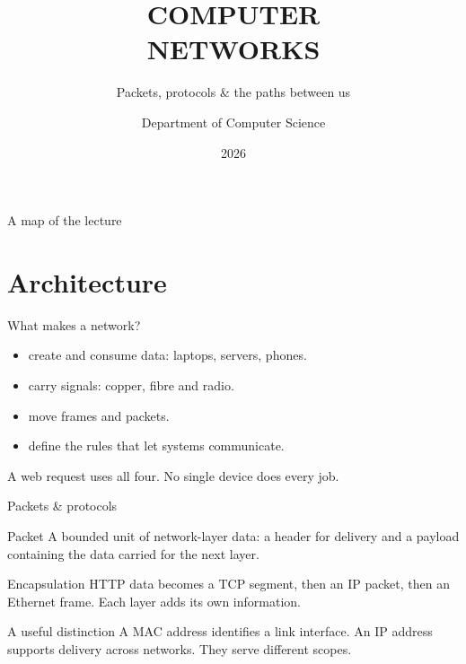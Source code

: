 \documentclass[aspectratio=\DemoAspect,10pt]{beamer}
\title[COMPUTER NETWORKS]{COMPUTER\\NETWORKS}
\subtitle{Packets, protocols \& the paths between us}
\author{Department of Computer Science}
\institute{Y2K / FIELD NOTES 01}
\date{2026}
\begin{document}
\begin{frame}[plain]\titlepage\end{frame}
\begin{frame}{A map of the lecture}
\end{frame}
\section{Architecture}
\begin{frame}{What makes a network?}
  \begin{itemize}\setlength{\itemsep}{.45cm}
    \item {} create and consume data: laptops, servers, phones.
    \item {} carry signals: copper, fibre and radio.
    \item {} move frames and packets.
    \item {} define the rules that let systems communicate.
  \end{itemize}
  \vspace{.25cm}
  \YTwoKSeparator
  {\small\color{y2kMuted}A web request uses all four. No single device does every job.}
\end{frame}
\begin{frame}{Packets \& protocols}
  \begin{YTwoKDefinition}{Packet}
    A bounded unit of network-layer data: a header for delivery and a payload
    containing the data carried for the next layer.
  \end{YTwoKDefinition}
  \begin{YTwoKExample}{Encapsulation}
    HTTP data becomes a TCP segment, then an IP packet, then an Ethernet frame.
    Each layer adds its own information.
  \end{YTwoKExample}
  \begin{YTwoKWarning}{A useful distinction}
    A MAC address identifies a link interface. An IP address supports delivery
    across networks. They serve different scopes.
  \end{YTwoKWarning}
\end{frame}
\end{document}
